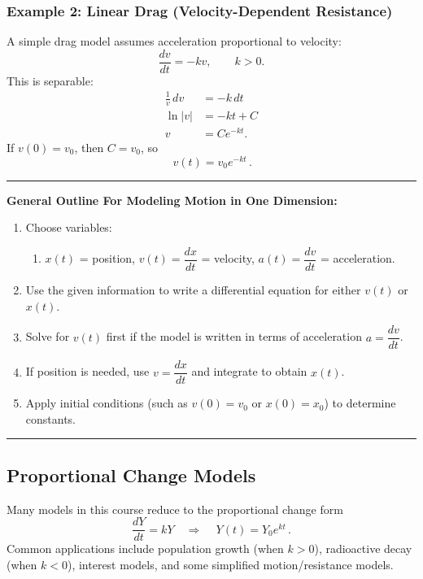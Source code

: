 \documentclass[11pt]{article}
\begin{document}
\subsubsection*{Example 2: Linear Drag (Velocity-Dependent Resistance)}
A simple drag model assumes acceleration proportional to velocity:
\[
\frac{dv}{dt}=-kv,\qquad k>0.
\]
This is separable:
\begin{align*}
\frac{1}{v}\,dv &= -k\,dt\\
\ln|v| &= -kt + C\\
v &= Ce^{-kt}.
\end{align*}
If $v(0)=v_0$, then $C=v_0$, so
\[
\boxed{\,v(t)=v_0e^{-kt}\,}.
\]

\noindent\rule{\linewidth}{0.4pt}
\textbf{General Outline For Modeling Motion in One Dimension:}
\begin{enumerate}[topsep=2pt, itemsep=2pt, leftmargin=*]
    \item Choose variables:
    \begin{enumerate}[topsep=2pt, itemsep=2pt, leftmargin=*]
        \item $x(t)$ = position, $v(t)=\dfrac{dx}{dt}$ = velocity, $a(t)=\dfrac{dv}{dt}$ = acceleration.
    \end{enumerate}
    \item Use the given information to write a differential equation for either $v(t)$ or $x(t)$.
    \item Solve for $v(t)$ first if the model is written in terms of acceleration $a=\dfrac{dv}{dt}$.
    \item If position is needed, use $v=\dfrac{dx}{dt}$ and integrate to obtain $x(t)$.
    \item Apply initial conditions (such as $v(0)=v_0$ or $x(0)=x_0$) to determine constants.
\end{enumerate}
\noindent\rule{\linewidth}{0.4pt}


\subsection{Proportional Change Models}

\noindent Many models in this course reduce to the proportional change form
\[
\frac{dY}{dt}=kY
\quad\Rightarrow\quad
\boxed{\,Y(t)=Y_0e^{kt}\,}.
\]
Common applications include population growth (when $k>0$), radioactive decay (when $k<0$), interest models, and some simplified motion/resistance models.

\newpage
\end{document}
